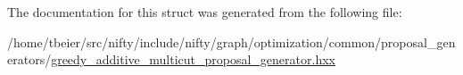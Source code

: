 The documentation for this struct was generated from the following file\+:\begin{DoxyCompactItemize}
\item 
/home/tbeier/src/nifty/include/nifty/graph/optimization/common/proposal\+\_\+generators/\hyperlink{greedy__additive__multicut__proposal__generator_8hxx}{greedy\+\_\+additive\+\_\+multicut\+\_\+proposal\+\_\+generator.\+hxx}\end{DoxyCompactItemize}
